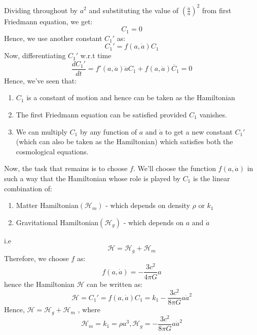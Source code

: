 \documentclass[12pt]{article}
\begin{document}
Dividing throughout by $a^{2}$ and substituting the value of $\left(\frac{\dot{a}}{a}\right)^{2}$ from first Friedmann equation, we get:
\begin{equation}
C_{1}=0
\end{equation}
Hence, we use another constant $C_{1}'$ as:
\begin{equation}
C_{1}'= f(a,\dot{a}) C_{1}
\end{equation}
Now, differentiating $C_{1}'$ w.r.t time
\begin{equation}
\frac{dC_{1}'}{dt}= f'(a,\dot{a})\dot{a}C_{1} + f(a,\dot{a})\dot{C_{1}}=0
\end{equation}
Hence, we've seen that:
\begin{enumerate}
    \item $C_{1}$  is a constant of motion and hence can be taken as the Hamiltonian
    \item The first Friedmann equation can be satisfied provided $C_{1}$ vanishes.
    \item We can multiply $C_{1}$ by any function of $a$ and $\dot{a}$ to get a new constant $C_{1}'$(which can also be taken as the Hamiltonian) which satisfies both the cosmological equations.
\end{enumerate}
Now, the task that remains is to choose $f$. We'll choose the function $f(a,\dot{a})$ in such a way that the Hamiltonian whose role is played by $C_{1}$ is the linear combination of:
\begin{enumerate}
    \item Matter Hamiltonian$(\mathcal{H}_{m})$ - which depends on density $\rho$ or $k_{1}$
    \item Gravitational Hamiltonian$(\mathcal{H}_{g})$ - which depends on $a$ and $\dot{a}$
\end{enumerate}
i.e
\begin{equation}
\mathcal{H}=\mathcal{H}_{g}+\mathcal{H}_{m}
\end{equation}
Therefore, we choose $f$ as:
\begin{equation}
f(a,\dot{a})=-\frac{3 c^{2}}{4 \pi G} a
\end{equation}
hence the Hamiltonian $\mathcal{H}$ can be written as:
\begin{equation}
\mathcal{H} = C_{1}' =f(a, \dot{a}) C_{1}= k_{1} - \frac{3 c^{2}}{8 \pi G} a \dot{a}^{2}
\end{equation}
Hence, $\mathcal{H}=\mathcal{H}_{g}+\mathcal{H}_{m}$ , where
\begin{equation}
\mathcal{H}_{m} = k_{1}=\rho a^{3}  ,   \mathcal{H}_{g} = -\frac{3 c^{2}}{8 \pi G} a \dot{a}^{2}
\end{equation}\\
\end{document}
